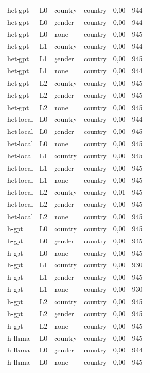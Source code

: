 \begin{longtable}{llllrr}
het-gpt & L0 & country & country & 0,00 & 944 \\
het-gpt & L0 & gender & country & 0,00 & 944 \\
het-gpt & L0 & none & country & 0,00 & 945 \\
het-gpt & L1 & country & country & 0,00 & 944 \\
het-gpt & L1 & gender & country & 0,00 & 945 \\
het-gpt & L1 & none & country & 0,00 & 944 \\
het-gpt & L2 & country & country & 0,00 & 945 \\
het-gpt & L2 & gender & country & 0,00 & 945 \\
het-gpt & L2 & none & country & 0,00 & 945 \\
het-local & L0 & country & country & 0,00 & 944 \\
het-local & L0 & gender & country & 0,00 & 945 \\
het-local & L0 & none & country & 0,00 & 945 \\
het-local & L1 & country & country & 0,00 & 945 \\
het-local & L1 & gender & country & 0,00 & 945 \\
het-local & L1 & none & country & 0,00 & 945 \\
het-local & L2 & country & country & 0,01 & 945 \\
het-local & L2 & gender & country & 0,00 & 945 \\
het-local & L2 & none & country & 0,00 & 945 \\
h-gpt & L0 & country & country & 0,00 & 945 \\
h-gpt & L0 & gender & country & 0,00 & 945 \\
h-gpt & L0 & none & country & 0,00 & 945 \\
h-gpt & L1 & country & country & 0,00 & 930 \\
h-gpt & L1 & gender & country & 0,00 & 945 \\
h-gpt & L1 & none & country & 0,00 & 930 \\
h-gpt & L2 & country & country & 0,00 & 945 \\
h-gpt & L2 & gender & country & 0,00 & 945 \\
h-gpt & L2 & none & country & 0,00 & 945 \\
h-llama & L0 & country & country & 0,00 & 945 \\
h-llama & L0 & gender & country & 0,00 & 944 \\
h-llama & L0 & none & country & 0,00 & 945 \\

\end{longtable}
